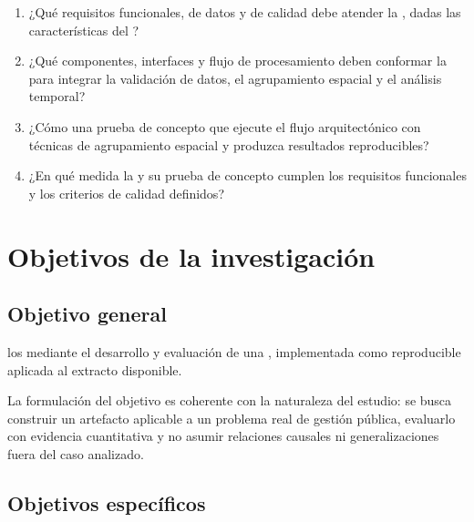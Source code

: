 \begin{enumerate}[label=PE\arabic*.]
    \item ¿Qué requisitos funcionales, de datos y de calidad debe atender la , dadas las características del ?
    \item ¿Qué componentes, interfaces y flujo de procesamiento deben conformar la  para integrar la validación de datos, el agrupamiento espacial y el análisis temporal?
    \item ¿Cómo  una prueba de concepto que ejecute el flujo arquitectónico con técnicas de agrupamiento espacial y produzca resultados reproducibles?
    \item ¿En qué medida la  y su prueba de concepto cumplen los requisitos funcionales y los criterios de calidad definidos?
\end{enumerate}

\section{Objetivos de la investigación}
\label{sec:objetivos}

\subsection{Objetivo general}

 los  mediante el desarrollo y evaluación de una , implementada como  reproducible aplicada al extracto disponible.

La formulación del objetivo es coherente con la naturaleza del estudio: se busca construir un artefacto aplicable a un problema real de gestión pública, evaluarlo con evidencia cuantitativa y no asumir relaciones causales ni generalizaciones fuera del caso analizado.

\subsection{Objetivos específicos}

